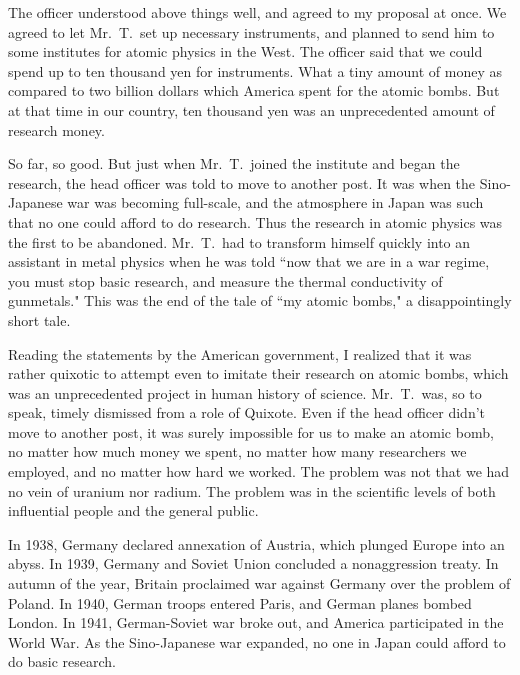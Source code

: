 \documentclass[11pt,a4j,twocolumn]{jarticle}
\begin{document}
The officer understood above things well, and agreed to my proposal at once.
We agreed to let Mr.\ T.\ set up necessary instruments,
and planned to send him to some institutes for atomic physics in the West.
The officer said that we could spend up to ten thousand yen for instruments.
What a tiny amount of money as compared to 
two billion dollars which America spent for the atomic bombs.
But at that time in our country,
ten thousand yen was an unprecedented amount of research money.

So far, so good. But just when Mr.\ T.\ joined the institute and began the research,
the head officer was told to move to another post.
It was when the Sino-Japanese war was becoming full-scale,
and the atmosphere in Japan was such that no one could afford to do research.
Thus the research in atomic physics was the first to be abandoned.
Mr.\ T.\ had to transform himself quickly into an assistant in metal physics
when he was told ``now that we are in a war regime, you must stop basic research,
and measure the thermal conductivity of gunmetals."
This was the end of the tale of ``my atomic bombs," a disappointingly short tale.

Reading the statements by the American government, I realized that
it was rather quixotic to attempt even to imitate their research on atomic bombs,
which was an unprecedented project in human history of science.
Mr.\ T.\ was, so to speak, timely dismissed from a role of Quixote.
Even if the head officer didn't move to another post,
it was surely impossible for us to make an atomic bomb,
no matter how much money we spent,
no matter how many researchers we employed,
and no matter how hard we worked.
The problem was not that we had no vein of uranium nor radium.
The problem was in the scientific levels of both influential people and the general public.

In 1938, Germany declared annexation of Austria, which plunged Europe into an abyss.
In 1939, Germany and Soviet Union concluded a nonaggression treaty.
In autumn of the year, Britain proclaimed war against Germany over the problem of Poland.
In 1940, German troops entered Paris, and German planes bombed London.
In 1941, German-Soviet war broke out, and America participated in the World War.
As the Sino-Japanese war expanded, no one in Japan could afford to do basic research. 
\end{document}
